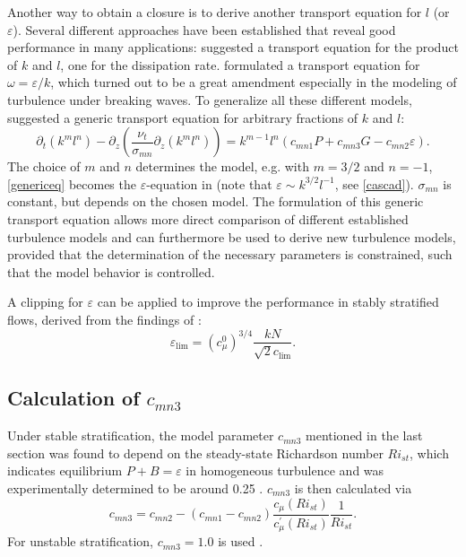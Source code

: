 Another way to obtain a closure is to derive another transport equation for $l$ 
(or $\varepsilon$). Several different approaches have been established that 
reveal good performance in many applications: \cite{mellor1982} suggested a 
transport equation for the product of $k$ and $l$, \cite{burchard1995} one for 
the dissipation rate. \cite{wilcox1998} formulated a transport equation for 
$\omega = \varepsilon \slash k$, which turned out to be a great amendment 
especially in the modeling of turbulence under breaking waves. To generalize all 
these different models, \cite{UmlaufBurchard2003a} suggested a generic transport 
equation for arbitrary fractions of $k$ and $l$: 
\begin{equation}
 \label{genericeq}
 \partial_t (k^m l^n) - \partial_z \left( \frac{\nu_t}{\sigma_{mn}} 
\partial_z(k^m l^n) \right) = k^{m-1} l^n (c_{mn1}P + c_{mn3} G - c_{mn2} 
\varepsilon ).
\end{equation}
The choice of $m$ and $n$ determines the model, e.g. with $m=3 \slash 2$ and 
$n=-1$, \eqref{genericeq} becomes the $\varepsilon$-equation in 
\cite{burchard1995} (note that $\varepsilon \sim k^{3 \slash 2} l^{-1}$, see 
\eqref{cascad}). $\sigma_{mn}$ is constant, but depends on the chosen model. The 
formulation of this generic transport equation allows more direct comparison of 
different established turbulence models and can furthermore be used to derive 
new turbulence models, provided that the determination of the necessary 
parameters is constrained, such that the model behavior is controlled.

A clipping for $\varepsilon$ can be applied to improve the performance in 
stably stratified flows, derived from the findings of \citep{Galperin1988}:
\begin{equation}
 \label{galperin}
 \varepsilon_{\lim} = (c_\mu^0)^{3 \slash 4} \frac{kN}{\sqrt{2} c_{\lim}}.
\end{equation}

\subsection{Calculation of $c_{mn3}$ }

Under stable stratification, the model parameter $c_{mn3}$ mentioned in the 
last section was found to depend on the steady-state Richardson number 
$Ri_{st}$, which indicates equilibrium $P + B = \varepsilon$ in homogeneous 
turbulence and was experimentally determined to be around 0.25 
\citep[][]{UmlaufBurchard2005a}. $c_{mn3}$ is then calculated via
\begin{equation}
 \label{cmn3}
 c_{mn3} = c_{mn2} - (c_{mn1} - c_{mn2}) \frac{c_\mu(Ri_{st})}{c_\mu^ \prime 
(Ri_{st})} \frac{1}{Ri_{st}}.
\end{equation}
For unstable stratification, $c_{mn3} = 1.0$ is used \citep[][]{Rodi1987}.

